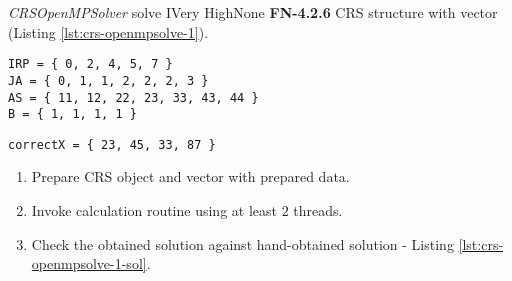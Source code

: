 \begin{testcase}{\emph{CRSOpenMPSolver} solve I}{Very High}{None}
		{
			\textbf{FN-4.2.6}
		}
		{
			\gls{CRS} structure with vector (Listing \ref{lst:crs-openmpsolve-1}).	
		}
		\begin{lstlisting}[label={lst:crs-openmpsolve-1},caption={\gls{CRS} format and vector data example}, frame=single]
IRP = { 0, 2, 4, 5, 7 }
JA = { 0, 1, 1, 2, 2, 2, 3 }
AS = { 11, 12, 22, 23, 33, 43, 44 }
B = { 1, 1, 1, 1 }
		\end{lstlisting}
		\begin{lstlisting}[label={lst:crs-openmpsolve-1-sol},caption={\gls{CRS} format and vector data example}, frame=single]
correctX = { 23, 45, 33, 87 }
		\end{lstlisting}

		{	
			\begin{enumerate}
				\item Prepare \gls{CRS} object and vector with prepared data.
				\item Invoke calculation routine using at least $2$ threads.
				\item
				{
					Check the obtained solution against hand-obtained solution - Listing \ref{lst:crs-openmpsolve-1-sol}.
				}
			\end{enumerate}
		}
	\end{testcase}
